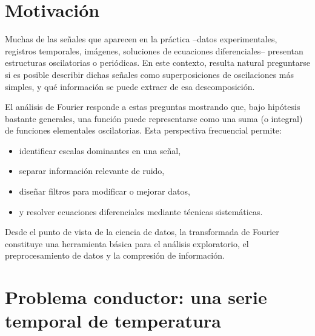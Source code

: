 \documentclass[12pt, a4paper]{amsbook}
\theoremstyle{remark}
\theoremstyle{definition}
\numberwithin{section}{chapter}
\numberwithin{subsection}{section}
\numberwithin{equation}{section}
\numberwithin{figure}{chapter}
\begin{document}
\section{Motivación}

Muchas de las señales que aparecen en la práctica --datos experimentales, registros temporales, imágenes, soluciones de ecuaciones diferenciales-- presentan estructuras oscilatorias o periódicas. En este contexto, resulta natural preguntarse si es posible describir dichas señales como superposiciones de oscilaciones más simples, y qué información se puede extraer de esa descomposición.

El análisis de Fourier responde a estas preguntas mostrando que, bajo hipótesis bastante generales, una función puede representarse como una suma (o integral) de funciones elementales oscilatorias. Esta perspectiva frecuencial permite:
\begin{itemize}
\item identificar escalas dominantes en una señal,
\item separar información relevante de ruido,
\item diseñar filtros para modificar o mejorar datos,
\item y resolver ecuaciones diferenciales mediante técnicas sistemáticas.
\end{itemize}

Desde el punto de vista de la ciencia de datos, la transformada de Fourier constituye una herramienta básica para el análisis exploratorio, el preprocesamiento de datos y la compresión de información.

\section{Problema conductor: una serie temporal de temperatura}\label{sec:conductor-senal}
\end{document}
